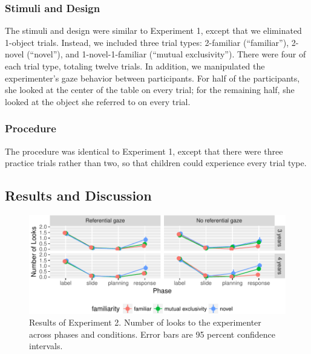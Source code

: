 \documentclass[10pt, letterpaper]{article}
\newenvironment{CodeChunk}{}{}
\begin{document}
\subsubsection{Stimuli and Design}\label{stimuli-and-design-1}

The stimuli and design were similar to Experiment 1, except that we
eliminated 1-object trials. Instead, we included three trial types:
2-familiar (``familiar''), 2-novel (``novel''), and 1-novel-1-familiar
(``mutual exclusivity''). There were four of each trial type, totaling
twelve trials. In addition, we manipulated the experimenter's gaze
behavior between participants. For half of the participants, she looked
at the center of the table on every trial; for the remaining half, she
looked at the object she referred to on every trial.

\subsubsection{Procedure}\label{procedure-1}

The procedure was identical to Experiment 1, except that there were
three practice trials rather than two, so that children could experience
every trial type.

\subsection{Results and Discussion}\label{results-and-discussion-1}

\begin{CodeChunk}
\begin{figure}[h]

{\centering \includegraphics{figs/results_e2-1} 

}

\caption[Results of Experiment 2]{Results of Experiment 2. Number of looks to the experimenter across phases and conditions. Error bars are 95 percent confidence intervals.}\label{fig:results_e2}
\end{figure}
\end{CodeChunk}
\end{document}
